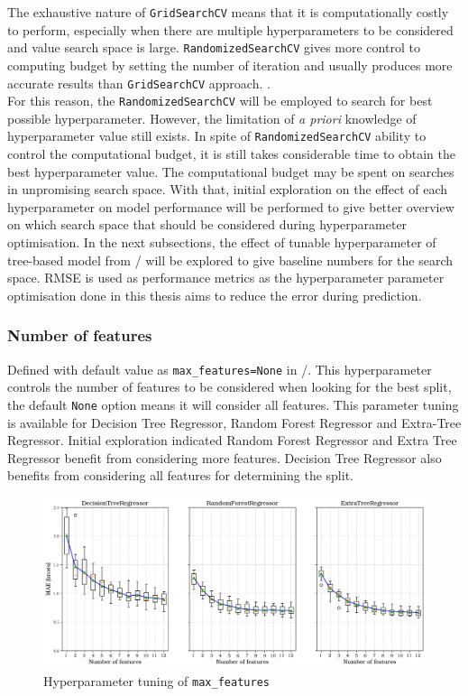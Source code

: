 The exhaustive nature of {\tt GridSearchCV} means that it is computationally costly to perform, especially when there are multiple hyperparameters to be considered and value search space is large. {\tt RandomizedSearchCV} gives more control to computing budget by setting the number of iteration and usually produces more accurate results than {\tt GridSearchCV} approach. . \\

For this reason, the {\tt RandomizedSearchCV} will be employed to search for best possible hyperparameter. However, the limitation of \emph{a priori} knowledge of hyperparameter value still exists. In spite of {\tt RandomizedSearchCV} ability to control the computational budget, it is still takes considerable time to obtain the best hyperparameter value. The computational budget may be spent on searches in unpromising search space. With that, initial exploration on the effect of each hyperparameter on model performance will be performed to give better overview on which search space that should be considered during hyperparameter optimisation. In the next subsections, the effect of tunable hyperparameter of tree-based model from \scikit/ will be explored to give baseline numbers for the search space. RMSE is used as performance metrics as the hyperparameter parameter optimisation done in this thesis aims to reduce the error during prediction. \\ 

\subsubsection*{Number of features}\label{sec:max_features}

Defined with default value as {\tt max\_features=None} in \scikit/. This hyperparameter controls the number of features to be considered when looking for the best split, the default {\tt None} option means it will consider all features. This parameter tuning is available for Decision Tree Regressor, Random Forest Regressor and Extra-Tree Regressor. Initial exploration indicated Random Forest Regressor and Extra Tree Regressor benefit from considering more features. Decision Tree Regressor also benefits from considering all features for determining the split.\\ 

\begin{figure}[h]
    \centering
        \includegraphics[width=.9\textwidth]{02_figures/hpo_n_features_mae.png}
        \caption{Hyperparameter tuning of {\tt max\_features}}
        \label{fig:hpo_n_features}
\end{figure}

